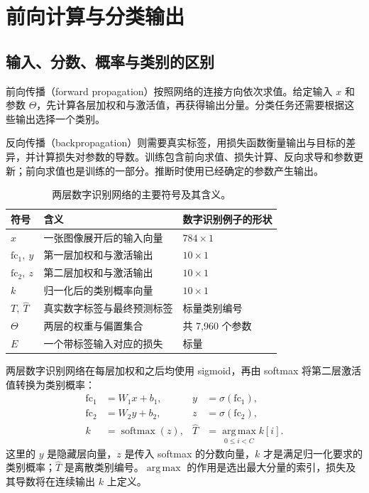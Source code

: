 \section{前向计算与分类输出}
\subsection{输入、分数、概率与类别的区别}

前向传播（forward propagation）按照网络的连接方向依次求值。给定输入 $x$ 和参数 $\Theta$，先计算各层加权和与激活值，再获得输出分量。分类任务还需要根据这些输出选择一个类别。

反向传播（backpropagation）则需要真实标签，用损失函数衡量输出与目标的差异，并计算损失对参数的导数。训练包含前向求值、损失计算、反向求导和参数更新；前向求值也是训练的一部分。推断时使用已经确定的参数产生输出。

\begin{table}[H]
\centering
\caption{两层数字识别网络的主要符号及其含义。}
\label{l10:tab:notation}
\begin{tabularx}{\linewidth}{lYl}
\toprule
符号 & 含义 & 数字识别例子的形状\\
\midrule
$x$ & 一张图像展开后的输入向量 & $784\times1$\\
$\mathrm{fc}_1,\ y$ & 第一层加权和与激活输出 & $10\times1$\\
$\mathrm{fc}_2,\ z$ & 第二层加权和与激活输出 & $10\times1$\\
$k$ & 归一化后的类别概率向量 & $10\times1$\\
$T,\ \widehat T$ & 真实数字标签与最终预测标签 & 标量类别编号\\
$\Theta$ & 两层的权重与偏置集合 & 共 7,960 个参数\\
$E$ & 一个带标签输入对应的损失 & 标量\\
\bottomrule
\end{tabularx}
\end{table}

两层数字识别网络在每层加权和之后均使用 sigmoid，再由 softmax 将第二层激活值转换为类别概率：
\begin{align}
 \mathrm{fc}_1&=W_1x+b_1,& y&=\sigma(\mathrm{fc}_1),\\
 \mathrm{fc}_2&=W_2y+b_2,& z&=\sigma(\mathrm{fc}_2),\\
 k&=\operatorname{softmax}(z),&\widehat T&=\operatorname*{arg\,max}_{0\le i<C}k[i].
 \label{l10:eq:forward-network}
\end{align}
这里的 $y$ 是隐藏层向量，$z$ 是传入 softmax 的分数向量，$k$ 才是满足归一化要求的类别概率；$\widehat T$ 是离散类别编号。$\operatorname*{arg\,max}$ 的作用是选出最大分量的索引，损失及其导数将在连续输出 $k$ 上定义。

